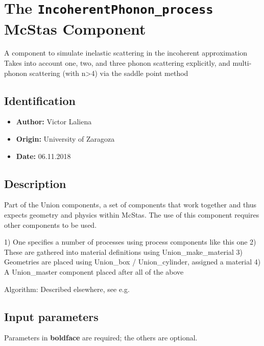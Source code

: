 \section{The \texttt{IncoherentPhonon\_process} McStas Component}
A component to simulate inelastic scattering in the incoherent approximation
Takes into account one, two, and three phonon scattering explicitly,
and multi-phonon scattering (with n\textgreater{}4) via the saddle point method

\subsection*{Identification}
\begin{itemize}
  \item \textbf{Author:} Victor Laliena
  \item \textbf{Origin:} University of Zaragoza
  \item \textbf{Date:} 06.11.2018
\end{itemize}

\subsection*{Description}
Part of the Union components, a set of components that work together and thus expects geometry and physics within McStas. The use of this component requires other components to be used.

1) One specifies a number of processes using process components like this one 2) These are gathered into material definitions using Union\_make\_material 3) Geometries are placed using Union\_box / Union\_cylinder, assigned a material 4) A Union\_master component placed after all of the above

Algorithm: Described elsewhere, see e.g. 

\subsection*{Input parameters}
Parameters in \textbf{boldface} are required; the others are optional.

